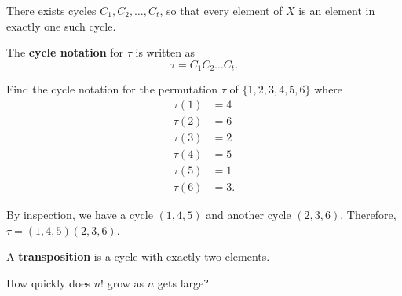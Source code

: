 \begin{corollary}
	There exists cycles \( C_{1},C_{2},\ldots ,C_t \), so that every element of \( X \) is an element in exactly one such cycle.
\end{corollary}

\begin{definition}
	The \textbf{cycle notation} for \( \tau  \) is written as \[
		\tau =C_{1}C_{2}\ldots C_t
	.\] 
\end{definition}

\begin{eg}
	Find the cycle notation for the permutation \( \tau  \) of \( \{1,2,3,4,5,6\}   \) where 
	\begin{align*}
		\tau (1)&=4 \\
		\tau (2)&=6 \\ 
		\tau (3)&= 2 \\
		\tau (4)&= 5 \\
		\tau (5)&= 1 \\
		\tau (6)&= 3
	.\end{align*}
\end{eg}
\begin{explanation}
	By inspection, we have a cycle \( (1,4,5) \) and another cycle \( (2,3,6) \). Therefore, \( \tau = (1,4,5)(2,3,6) \).
\end{explanation}

\begin{definition}
	A \textbf{transposition} is a cycle with exactly two elements.
\end{definition}

\begin{problem}
	How quickly does \( n! \) grow as \( n \) gets large?
\end{problem}
